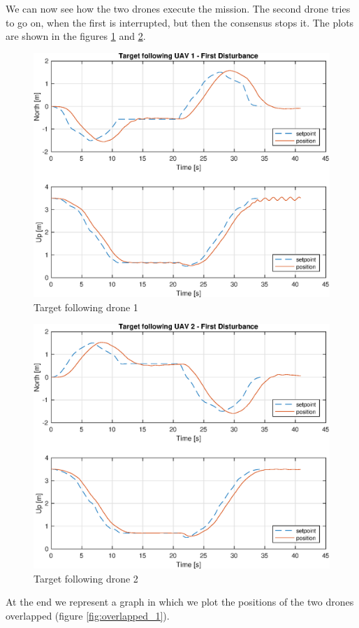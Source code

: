 We can now see how the two drones execute the mission. The second drone tries to
go on, when the first is interrupted, but then the consensus stops it. The plots are
shown in the figures \ref{fig:following_1_1} and \ref{fig:following_2_1}.

\begin{figure}
\centering
\includegraphics[width=0.7\linewidth]{chapters/chapter-04/figures/following_1_1.eps}
\caption{Target following drone 1}
\label{fig:following_1_1}
\end{figure}

\begin{figure}
\centering
\includegraphics[width=0.7\linewidth]{chapters/chapter-04/figures/following_2_1.eps}
\caption{Target following drone 2}
\label{fig:following_2_1}
\end{figure}

At the end we represent a graph in which we plot the positions of the two drones overlapped
(figure \ref{fig:overlapped_1}).

